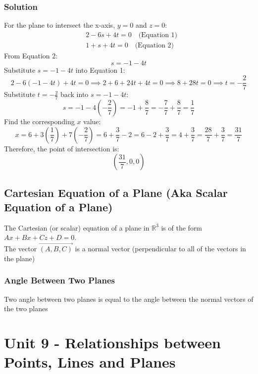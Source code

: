 \documentclass{article}
\begin{document}
\subsubsection*{Solution}
For the plane to intersect the x-axis, \(y = 0\) and \(z = 0\):
\begin{align*}
    &2 - 6s + 4t = 0 \quad \text{(Equation 1)} \\
    &1 + s + 4t = 0 \quad \text{(Equation 2)}
\end{align*}
From Equation 2:
\[
s = -1 - 4t
\]
Substitute \(s = -1 - 4t\) into Equation 1:
\[
2 - 6(-1 - 4t) + 4t = 0 \implies 2 + 6 + 24t + 4t = 0 \implies 8 + 28t = 0 \implies t = -\frac{2}{7}
\]
Substitute \(t = -\frac{2}{7}\) back into \(s = -1 - 4t\):
\[
s = -1 - 4\left(-\frac{2}{7}\right) = -1 + \frac{8}{7} = -\frac{7}{7} + \frac{8}{7} = \frac{1}{7}
\]
Find the corresponding \(x\) value:
\[
x = 6 + 3\left(\frac{1}{7}\right) + 7\left(-\frac{2}{7}\right) = 6 + \frac{3}{7} - 2 = 6 - 2 + \frac{3}{7} = 4 + \frac{3}{7} = \frac{28}{7} + \frac{3}{7} = \frac{31}{7}
\]
Therefore, the point of intersection is:
\[
\left( \frac{31}{7}, 0, 0 \right)
\]

\subsection{Cartesian Equation of a Plane (Aka Scalar Equation of a Plane)}

\begin{tcolorbox}[colback=red!5!snow, colframe=red!50!white,
  colbacktitle=red!75!mistyrose]
The Cartesian (or scalar) equation of a plane in $\mathbb{R}^3$ is of the form $Ax+Bx+Cz+D=0$. \\
The vector $\overrightarrow{(A,B,C)}$ is a normal vector (perpendicular to all of the vectors in the plane)
\end{tcolorbox}  
\subsubsection{Angle Between Two Planes}
\begin{tcolorbox}[colback=red!5!snow, colframe=red!50!white,
  colbacktitle=red!75!mistyrose]
Two angle between two planes is equal to the angle between the normal vectors of the two planes
  
\end{tcolorbox} 

\section{Unit 9 - Relationships between Points, Lines and Planes}
\end{document}
